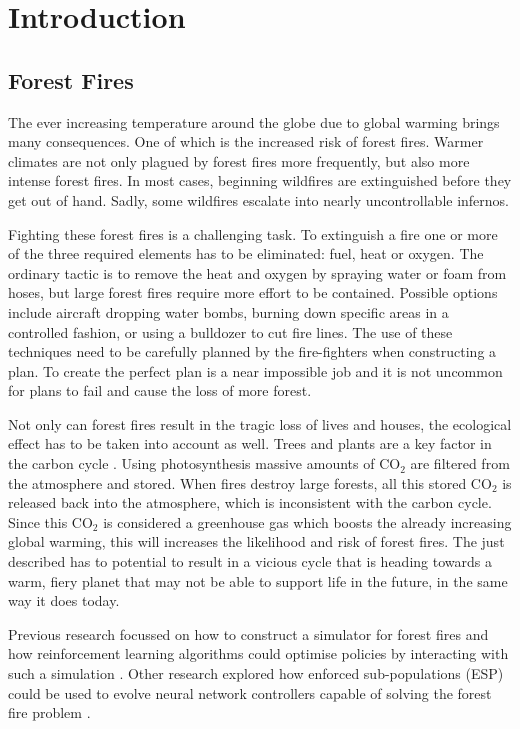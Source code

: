 
\section{Introduction}\label{sec:introduction}

\subsection{Forest Fires}
The ever increasing temperature around the globe due to global warming brings many consequences. One of which is the increased risk of forest fires. Warmer climates are not only plagued by forest fires more frequently, but also more intense forest fires.  In most cases, beginning wildfires are extinguished before they get out of hand. Sadly, some wildfires escalate into nearly uncontrollable infernos.

Fighting these forest fires is a challenging task. To extinguish a fire one or more of the three required elements has to be eliminated: fuel, heat or oxygen. The ordinary tactic is to remove the heat and oxygen by spraying water or foam from hoses, but large forest fires require more effort to be contained. Possible options include aircraft dropping water bombs, burning down specific areas in a controlled fashion, or using a bulldozer to cut fire lines. The use of these techniques need to be carefully planned by the fire-fighters when constructing a plan. To create the perfect plan is a near impossible job and it is not uncommon for plans to fail and cause the loss of more forest.

Not only can forest fires result in the tragic loss of lives and houses, the ecological effect has to be taken into account as well. Trees and plants are a key factor in the carbon cycle \citep{kasischke1995fire}. Using photosynthesis massive amounts of CO$_{2}$ are filtered from the atmosphere and stored. When fires destroy large forests, all this stored CO$_{2}$ is released back into the atmosphere, which is inconsistent with the carbon cycle. Since this CO$_{2}$ is considered a greenhouse gas \citep{houghton1991climate} which boosts the already increasing global warming, this will increases the likelihood and risk of forest fires. The just described has to potential to result in a vicious cycle that is heading towards a warm, fiery planet that may not be able to support life in the future, in the same way it does today. 

Previous research focussed on how to construct a simulator for forest fires and how reinforcement learning algorithms could optimise policies by interacting with such a simulation \citep{wiering1998learning}. Other research explored how enforced sub-populations (ESP) could be used to evolve neural network controllers capable of solving the forest fire problem \citep{wiering2005evolving}.

